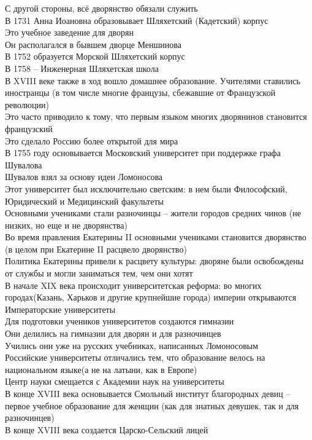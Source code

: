 \documentclass[12pt]{article}
\begin{document}
С другой стороны, всё дворянство обязали служить\\
В 1731 Анна Иоановна образовывает Шляхетский (Кадетский) корпус\\
Это учебное заведение для дворян\\
Он располагался в бывшем дворце Меншинова\\
В 1752 образуется Морской Шляхетский корпус\\
В 1758 -- Инженерная Шляхетская школа\\
В XVIII веке также в ход вошло домашнее образование. Учителями ставились иностранцы (в том числе многие французы, сбежавшие от Французской революции)\\
Это часто приводило к тому, что первым языком многих дворянинов становится французский\\
Это сделало Россию более открытой для мира\\
В 1755 году основывается Московский университет при поддержке графа Шувалова\\
Шувалов взял за основу идеи Ломоносова\\
Этот университет был исключительно светским: в нем были Философский, Юридический и Медицинский факультеты\\
Основными учениками стали разночинцы -- жители городов средних чинов (не низких, но еще и не дворянства)\\
Во время правления Екатерины II основными учениками становится дворянство (в целом при Екатерине II расцвело дворянство)\\
Политика Екатерины привели к расцвету культуры: дворяне были освобождены от службы и могли заниматься тем, чем они хотят\\
В начале XIX века происходит университетская реформа: во многих городах(Казань, Харьков и другие крупнейшие города) империи открываются Императорские университеты\\
Для подготовки учеников университетов создаются гимназии\\
Они делились на гимназии для дворян и для разночинцев\\
Учились они уже на русских учебниках, написанных Ломоносовым\\
Российские университеты отличались тем, что образование велось на национальном языке(а не на латыни, как в Европе)\\
Центр науки смещается с Академии наук на университеты\\
В конце XVIII века основывается Смольный институт благородных девиц -- первое учебное образование для женщин (как для знатных девушек, так и для разночинцев)\\
В конце XVIII века создается Царско-Сельский лицей
\end{document}
